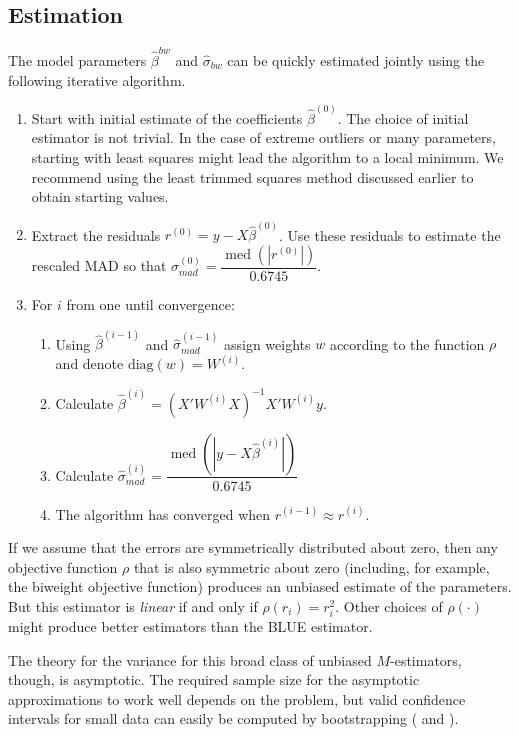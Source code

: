 \documentclass[12pt]{article}
\DeclareMathOperator{\med}{med}
\begin{document}
\subsection*{Estimation}

The model parameters $\hat{\beta}^{bw}$ and $\hat{\sigma}_{bw}$ can be quickly estimated jointly using the following iterative algorithm.
\begin{enumerate}
\item Start with initial estimate of the coefficients $\hat{\beta}^{(0)}$. The choice of initial estimator is not trivial. 
In the case of extreme outliers or many parameters, starting with least squares might lead the algorithm to a local minimum. 
We recommend using the least trimmed squares method discussed earlier to obtain starting values.
\item Extract the residuals $r^{(0)} = y - X\hat{\beta}^{(0)}$. 
Use these residuals to estimate the rescaled MAD so that $\hat{\sigma}^{(0)}_{mad} = \dfrac{\med\left( |r^{(0)}|\right)}{0.6745}$.
\item For $i$ from one until convergence:
        \begin{enumerate}
        \item Using $\hat{\beta}^{(i-1)}$ and $\hat{\sigma}^{(i-1)}_{mad}$ assign weights $w$ according to the function $\rho$ and denote $\text{diag}(w) = W^{(i)}$.
        \item Calculate $\hat{\beta}^{(i)} = (X'W^{(i)}X)^{-1}X'W^{(i)}y$.
        \item Calculate $\hat{\sigma}^{(i)}_{mad} = \dfrac{\med\left( |y - X\hat{\beta}^{(i)}|\right)}{0.6745}$
        \item The algorithm has converged when $r^{(i-1)} \approx r^{(i)}$.
        \end{enumerate}
\end{enumerate}

If we assume that the errors are symmetrically distributed about zero, then any objective function $\rho$ that is also symmetric about zero (including, for example, the biweight objective function) produces an unbiased estimate of the parameters. 
But this estimator is \textit{linear} if and only if $\rho(r_i) = r_i^2$. Other choices of $\rho(\cdot)$ might produce better estimators than the BLUE estimator.  

The theory for the variance for this broad class of unbiased $M$-estimators, though, is asymptotic. 
The required sample size for the asymptotic approximations to work well depends on the problem, but valid confidence intervals for small data can easily be computed by bootstrapping (\citealt{Efron1981} and \citealt{MooneyDuval1993}). 
\end{document}
